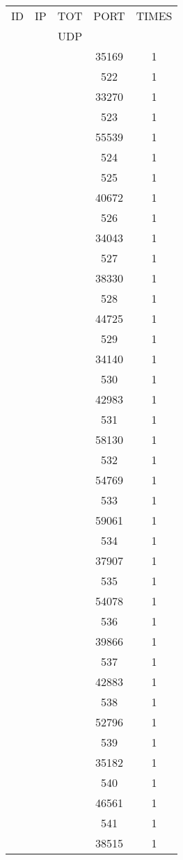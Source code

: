 \documentclass[a4paper]{scrartcl}
\begin{document}
\begin{minipage}[b]{0.5\linewidth}
\begin{tabular}{| c | c | c | c | c |}
\hline
ID & IP & TOT & PORT & TIMES \\ 
   &    & UDP &      &       \\ 
\hline
& & & 35169 & 1 \\ & & & 522 & 1 \\ & & & 33270 & 1 \\ & & & 523 & 1 \\ & & & 55539 & 1 \\ & & & 524 & 1 \\ & & & 525 & 1 \\ & & & 40672 & 1 \\ & & & 526 & 1 \\ & & & 34043 & 1 \\ & & & 527 & 1 \\ & & & 38330 & 1 \\ & & & 528 & 1 \\ & & & 44725 & 1 \\ & & & 529 & 1 \\ & & & 34140 & 1 \\ & & & 530 & 1 \\ & & & 42983 & 1 \\ & & & 531 & 1 \\ & & & 58130 & 1 \\ & & & 532 & 1 \\ & & & 54769 & 1 \\ & & & 533 & 1 \\ & & & 59061 & 1 \\ & & & 534 & 1 \\ & & & 37907 & 1 \\ & & & 535 & 1 \\ & & & 54078 & 1 \\ & & & 536 & 1 \\ & & & 39866 & 1 \\ & & & 537 & 1 \\ & & & 42883 & 1 \\ & & & 538 & 1 \\ & & & 52796 & 1 \\ & & & 539 & 1 \\ & & & 35182 & 1 \\ & & & 540 & 1 \\ & & & 46561 & 1 \\ & & & 541 & 1 \\ & & & 38515 & 1 \\ \hline\end{tabular}\end{minipage} \hfill\begin{minipage}[b]{0.5\linewidth}\begin{tabular}{| c | c | c | c | c |}

\end{tabular}
\end{minipage}
\end{document}
